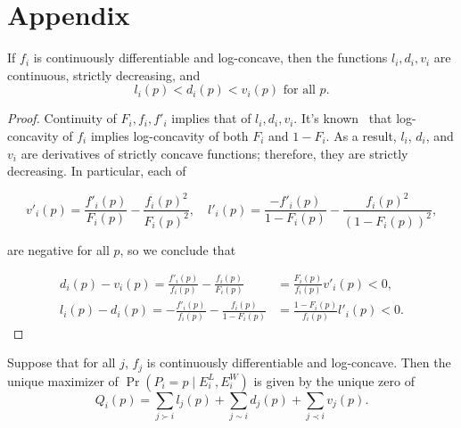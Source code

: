 \section*{Appendix}
\begingroup
\def\thetheorem{\ref{lem:decrease}}
\begin{lemma}
If $f_i$ is continuously differentiable and log-concave, then the functions $l_i,d_i,v_i$ are continuous, strictly decreasing, and
\[l_i(p) < d_i(p) < v_i(p) \text{ for all }p.\]
\end{lemma}
\addtocounter{theorem}{-1}
\endgroup
\begin{proof}
Continuity of $F_i,f_i,f'_i$ implies that of $l_i,d_i,v_i$. It's known~\cite{concave} that log-concavity of $f_i$ implies log-concavity of both $F_i$ and $1-F_i$. As a result, $l_i$, $d_i$, and $v_i$ are derivatives of strictly concave functions; therefore, they are strictly decreasing. In particular, each of

\[v'_i(p) = \frac{f'_i(p)}{F_i(p)} - \frac{f_i(p)^2}{F_i(p)^2},\quad
l'_i(p) = \frac{-f'_i(p)}{1-F_i(p)} - \frac{f_i(p)^2}{(1-F_i(p))^2},\]

are negative for all $p$, so we conclude that

\begin{align*}
d_i(p) - v_i(p)
= \frac{f'_i(p)}{f_i(p)} - \frac{f_i(p)}{F_i(p)}
&= \frac{F_i(p)}{f_i(p)} v'_i(p)
< 0,
\\l_i(p) - d_i(p)
= -\frac{f'_i(p)}{f_i(p)} -\frac{f_i(p)}{1-F_i(p)}
&= \frac{1-F_i(p)}{f_i(p)} l'_i(p)
< 0.
\end{align*}

\end{proof}

\iffalse

\begingroup
\def\thetheorem{\ref{thm:uniq-max}}
\begin{theorem}
Suppose that for all $j$, $f_j$ is continuously differentiable and log-concave. Then the unique maximizer of $\Pr(P_i=p\mid E^L_i,E^W_i)$ is given by the unique zero of
\[Q_i(p) = \sum_{j \succ i} l_j(p) + \sum_{j \sim i} d_j(p) + \sum_{j \prec i} v_j(p).\]
\end{theorem}
\addtocounter{theorem}{-1}
\endgroup

